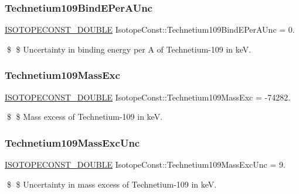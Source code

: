 \subsubsection{\texorpdfstring{Technetium109\+Bind\+E\+Per\+A\+Unc}{Technetium109BindEPerAUnc}}
{\footnotesize\ttfamily \mbox{\hyperlink{group___isotope_const-_macros_ga8f45a7272ce02c0b4c65c44636ed719a}{I\+S\+O\+T\+O\+P\+E\+C\+O\+N\+S\+T\+\_\+\+D\+O\+U\+B\+LE}} Isotope\+Const\+::\+Technetium109\+Bind\+E\+Per\+A\+Unc = 0.}

\$ \$ Uncertainty in binding energy per A of Technetium-\/109 in keV. \mbox{\label{group___isotope_const-_technetium-_tc109_ga7f1807c2a9dc750571f224da05a25a8c}} 
\subsubsection{\texorpdfstring{Technetium109\+Mass\+Exc}{Technetium109MassExc}}
{\footnotesize\ttfamily \mbox{\hyperlink{group___isotope_const-_macros_ga8f45a7272ce02c0b4c65c44636ed719a}{I\+S\+O\+T\+O\+P\+E\+C\+O\+N\+S\+T\+\_\+\+D\+O\+U\+B\+LE}} Isotope\+Const\+::\+Technetium109\+Mass\+Exc = -\/74282.}

\$ \$ Mass excess of Technetium-\/109 in keV. \mbox{\label{group___isotope_const-_technetium-_tc109_ga021cb3a56ee57b1ac786809a4de3d861}} 
\subsubsection{\texorpdfstring{Technetium109\+Mass\+Exc\+Unc}{Technetium109MassExcUnc}}
{\footnotesize\ttfamily \mbox{\hyperlink{group___isotope_const-_macros_ga8f45a7272ce02c0b4c65c44636ed719a}{I\+S\+O\+T\+O\+P\+E\+C\+O\+N\+S\+T\+\_\+\+D\+O\+U\+B\+LE}} Isotope\+Const\+::\+Technetium109\+Mass\+Exc\+Unc = 9.}

\$ \$ Uncertainty in mass excess of Technetium-\/109 in keV. \mbox{\label{group___isotope_const-_technetium-_tc109_ga7124fd6cd6bab5c133b1243074a7987b}} 
